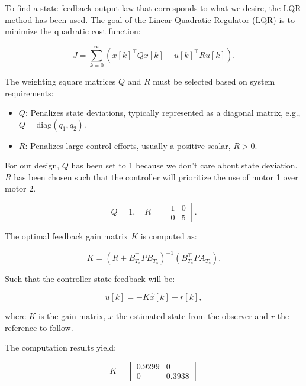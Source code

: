 To find a state feedback output law that corresponds to what we desire, the LQR method has been used.
The goal of the Linear Quadratic Regulator (LQR) is to minimize the quadratic cost function:

\[
J = \sum_{k=0}^\infty \left( x[k]^\top Q x[k] + u[k]^\top R u[k] \right).
\]

The weighting square matrices \( Q \) and \( R \) must be selected based on system requirements:

\begin{itemize}
    \item \( Q \): Penalizes state deviations, typically represented as a diagonal matrix, e.g., \( Q = \text{diag}(q_1, q_2) \).
    \item \( R \): Penalizes large control efforts, usually a positive scalar, \( R > 0 \).
\end{itemize}

For our design, $Q$ has been set to 1 because we don't care about state deviation. $R$ has been chosen such that the 
controller will prioritize the use of motor 1 over motor 2. 

\[
Q = 1, \quad
R = \begin{bmatrix}
1 & 0 \\
0 & 5
\end{bmatrix}.
\]

The optimal feedback gain matrix \( K \) is computed as:

\[
K = \left( R + B_{T_s}^\top P B_{T_s} \right)^{-1} \left(B_{T_s}^\top P A_{T_s} \right).
\]

Such that the controller state feedback will be:

\[
u[k] = -K \hat{x}[k] + r[k],
\]

where \( K \) is the gain matrix, $\hat{x}$ the estimated state from the observer and $r$ the reference to follow.

The computation results yield:

\[
K = \begin{bmatrix}
    0.9299 & 0\\
    0 & 0.3938
\end{bmatrix}
\]
